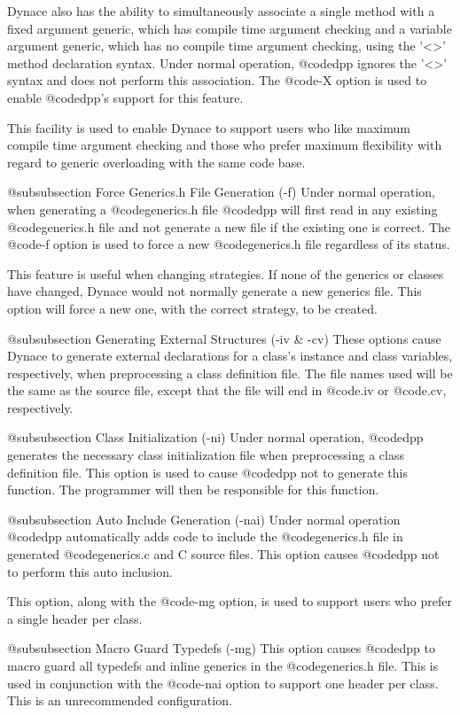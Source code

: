 Dynace also has the ability to simultaneously associate a single method
with a fixed argument generic, which has compile time argument checking
and a variable argument generic, which has no compile time argument
checking, using the '<>' method declaration syntax.  Under normal
operation, @code{dpp} ignores the '<>' syntax and does not perform
this association.  The @code{-X} option is used to enable @code{dpp}'s
support for this feature.

This facility is used to enable Dynace to support users who like
maximum compile time argument checking and those who prefer maximum
flexibility with regard to generic overloading with the same code
base.

@subsubsection Force Generics.h File Generation (-f)
Under normal operation, when generating a @code{generics.h} file
@code{dpp} will first read in any existing @code{generics.h} file
and not generate a new file if the existing one is correct.  The
@code{-f} option is used to force a new @code{generics.h} file
regardless of its status.

This feature is useful when changing strategies.  If none of the generics
or classes have changed, Dynace would not normally generate a new generics
file.  This option will force a new one, with the correct strategy, to
be created.

@subsubsection Generating External Structures (-iv & -cv)
These options cause Dynace to generate external declarations for
a class's instance and class variables, respectively, when preprocessing
a class definition file.  The file names used will be the same as
the source file, except that the file will end in @code{.iv} or
@code{.cv}, respectively.

@subsubsection Class Initialization (-ni)
Under normal operation, @code{dpp} generates the necessary class
initialization file when preprocessing a class definition file.
This option is used to cause @code{dpp} not to generate this
function.  The programmer will then be responsible for this
function.

@subsubsection Auto Include Generation (-nai)
Under normal operation @code{dpp} automatically adds code to include the
@code{generics.h} file in generated @code{generics.c} and C source
files.  This option causes @code{dpp} not to perform this auto inclusion.

This option, along with the @code{-mg} option, is used to support
users who prefer a single header per class.

@subsubsection Macro Guard Typedefs (-mg)
This option causes @code{dpp} to macro guard all typedefs and inline
generics in the @code{generics.h} file.  This is used in conjunction
with the @code{-nai} option to support one header per class.  This is an
unrecommended configuration.


